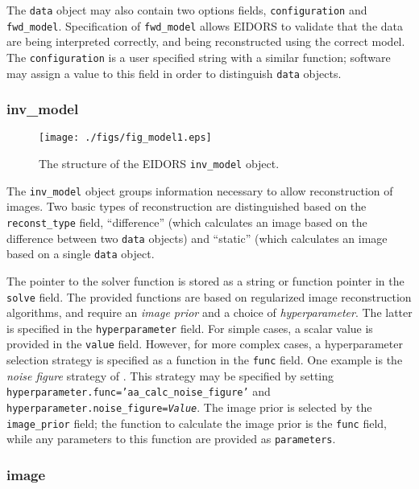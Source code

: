 \documentclass[12pt]{iopart}
\begin{document}
The {\tt data} object may also contain two options fields,
{\tt configuration} and {\tt fwd\_model}. Specification
of {\tt fwd\_model} allows EIDORS to validate that the
data are being interpreted correctly, and being reconstructed
using the correct model. The {\tt configuration} is
a user specified string with a similar function; software
may assign a value to this field in order to distinguish
{\tt data} objects.


\subsubsection{inv\_model}

%
%
\begin{figure}[th]
\begin{flushright}
\texttt{[image: ./figs/fig\_model1.eps]}
\caption{\small The structure of the EIDORS {\tt inv\_model} object.
\label{fig:inv_model}
 }
\end{flushright}
\end{figure}

The {\tt inv\_model} object groups information necessary to 
allow reconstruction of images. Two basic types of reconstruction
are distinguished based on the {\tt reconst\_type} field, 
``difference'' (which calculates an image based on the difference
between two {\tt data} objects) and ``static'' (which calculates an
image based on a single {\tt data} object.

The pointer to the solver function is stored as a string or function
pointer in the {\tt solve} field. The provided functions are based
on regularized image reconstruction algorithms, and require 
an {\em image prior} and a choice of {\em hyperparameter}. 
The latter is specified in the {\tt hyperparameter} field. For
simple cases, a scalar value is provided in the {\tt value} field.
However, for more complex cases, a hyperparameter selection strategy
is specified as a function in the {\tt func} field. One example
is the {\em noise figure} strategy of \cite{Adler_and_Guardo_1996}.
This strategy may be specified by setting
 {\tt hyperparameter.func='aa\_calc\_noise\_figure'}
and 
 {\tt hyperparameter.noise\_figure=\em Value}.
The image prior is selected by the {\tt image\_prior} field;
the function to calculate the image prior is the {\tt func}
field, while
any parameters to this function are provided as {\tt parameters}.

\subsubsection{image}
\end{document}
